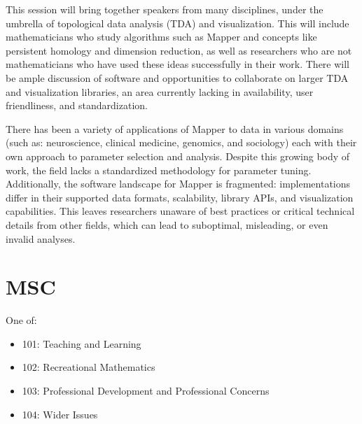 \documentclass{article}
\begin{document}
This session will bring together speakers from many disciplines, under the umbrella of topological data analysis (TDA) and visualization. 
This will include mathematicians who study algorithms such as Mapper and concepts like persistent homology and dimension reduction, 
as well as researchers who are not mathematicians who have used these ideas successfully in their work. 
There will be ample discussion of software and opportunities to collaborate on larger TDA and visualization libraries, 
an area currently lacking in availability, user friendliness, and standardization. 

There has been a variety of applications of Mapper to data in various domains (such as: neuroscience, clinical medicine, genomics, and sociology) each with their own approach to parameter selection and analysis. 
Despite this growing body of work, the field lacks a standardized methodology for parameter tuning. 
Additionally, the software landscape for Mapper is fragmented: implementations differ in their supported data formats, scalability, library APIs, and visualization capabilities. 
This leaves researchers unaware of best practices or critical technical details from other fields, which can lead to suboptimal, misleading, or even invalid analyses.

\section{MSC}

One of:

\begin{itemize}
    \item 101: Teaching and Learning
    \item 102: Recreational Mathematics
    \item 103: Professional Development and Professional Concerns
    \item 104: Wider Issues
\end{itemize}
\end{document}
